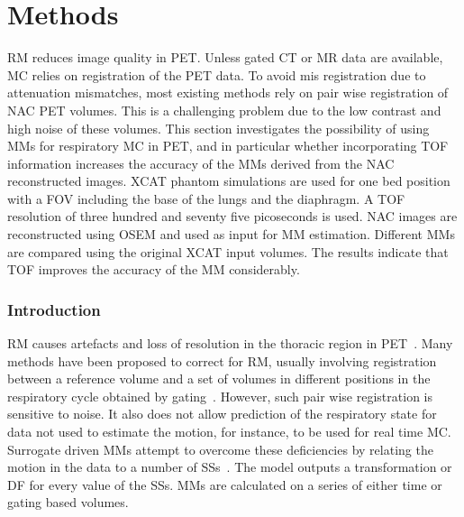 \chapter{Methods} \label{methods}
    \blindtext
    
        \gls{RM} reduces image quality in \gls{PET}. Unless gated \gls{CT} or \gls{MR} data are available, \gls{MC} relies on registration of the \gls{PET} data. To avoid mis registration due to attenuation mismatches, most existing methods rely on pair wise registration of \gls{NAC} \gls{PET} volumes. This is a challenging problem due to the low contrast and high noise of these volumes. This section investigates the possibility of using \gls{MM}s for respiratory \gls{MC} in \gls{PET}, and in particular whether incorporating \gls{TOF} information increases the accuracy of the \gls{MM}s derived from the \gls{NAC} reconstructed images. \gls{XCAT} phantom simulations are used for one bed position with a \gls{FOV} including the base of the lungs and the diaphragm. A \gls{TOF} resolution of three hundred and seventy five picoseconds is used. \gls{NAC} images are reconstructed using \gls{OSEM} and used as input for \gls{MM} estimation. Different \gls{MM}s are compared using the original \gls{XCAT} input volumes. The results indicate that \gls{TOF} improves the accuracy of the \gls{MM} considerably.
        
        \subsection{Introduction} \label{impact_of_tof_on_respiratory_motion_modelling_using_nac_pet_introduction}
        \gls{RM} causes artefacts and loss of resolution in the thoracic region in \gls{PET}~\cite{Nehmeh2008}. Many methods have been proposed to correct for \gls{RM}, usually involving registration between a reference volume and a set of volumes in different positions in the respiratory cycle obtained by gating~\cite{Oliveira2014}. However, such pair wise registration is sensitive to noise. It also does not allow prediction of the respiratory state for data not used to estimate the motion, for instance, to be used for real time \gls{MC}. Surrogate driven \gls{MM}s attempt to overcome these deficiencies by relating the motion in the data to a number of \gls{SS}s~\cite{McClelland2013}. The model outputs a transformation or \gls{DF} for every value of the \gls{SS}s. \gls{MM}s are calculated on a series of either time or gating based volumes.

